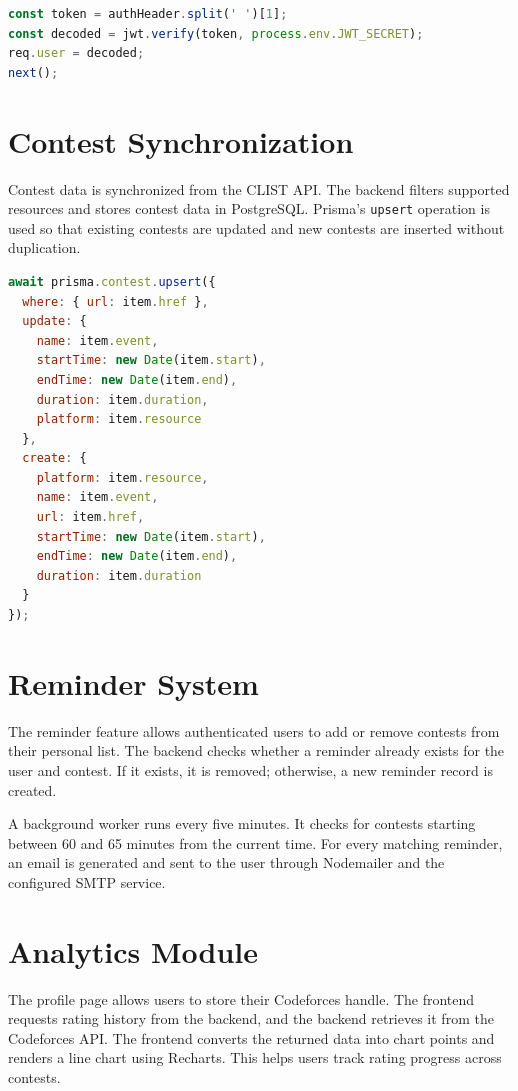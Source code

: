 \documentclass[12pt,a4paper]{report}
\begin{document}
\begin{normalsize}
\begin{lstlisting}[language=JavaScript, caption={JWT authentication middleware}]
const token = authHeader.split(' ')[1];
const decoded = jwt.verify(token, process.env.JWT_SECRET);
req.user = decoded;
next();
\end{lstlisting}

\section{Contest Synchronization}

Contest data is synchronized from the CLIST API. The backend filters supported resources and stores contest data in PostgreSQL. Prisma's \texttt{upsert} operation is used so that existing contests are updated and new contests are inserted without duplication.

\begin{lstlisting}[language=JavaScript, caption={Contest upsert logic}]
await prisma.contest.upsert({
  where: { url: item.href },
  update: {
    name: item.event,
    startTime: new Date(item.start),
    endTime: new Date(item.end),
    duration: item.duration,
    platform: item.resource
  },
  create: {
    platform: item.resource,
    name: item.event,
    url: item.href,
    startTime: new Date(item.start),
    endTime: new Date(item.end),
    duration: item.duration
  }
});
\end{lstlisting}

\section{Reminder System}

The reminder feature allows authenticated users to add or remove contests from their personal list. The backend checks whether a reminder already exists for the user and contest. If it exists, it is removed; otherwise, a new reminder record is created.

\vspace{0.3cm}

\noindent
A background worker runs every five minutes. It checks for contests starting between 60 and 65 minutes from the current time. For every matching reminder, an email is generated and sent to the user through Nodemailer and the configured SMTP service.

\section{Analytics Module}

The profile page allows users to store their Codeforces handle. The frontend requests rating history from the backend, and the backend retrieves it from the Codeforces API. The frontend converts the returned data into chart points and renders a line chart using Recharts. This helps users track rating progress across contests.


\end{normalsize}
\end{document}

